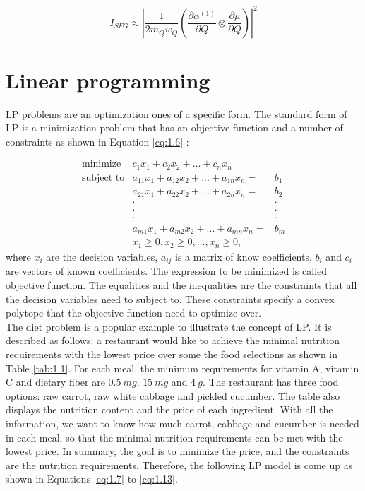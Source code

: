 \begin{equation} \label{eq:1.5}
I_{SFG} \approx \left| \frac{1}{2m_{Q}w_{Q}} \left( \frac{\partial\alpha^{(1)}}{\partial Q} \otimes \frac{\partial\mu}{\partial Q} \right) \right|^{2}
\end{equation}

\section{Linear programming}
LP problems are an optimization ones of a specific form. The standard form of LP is a minimization problem that has an objective function and a number of constraints as shown in Equation \ref{eq:1.6} \cite{UULP}:

\begin{eqnarray}  \label{eq:1.6}
 \text{minimize} & c_{1}x_{1} + c_{2}x_{2} + ... + c_{n} x_{n}  \nonumber \\
 \text{subject to} & a_{11} x_{1} + a_{12} x_{2}+ ... + a_{1n} x_{n} = & b_{1} \nonumber \\
& a_{21} x_{1} + a_{22} x_{2} + ... + a_{2n} x_{n} = & b_{2} \nonumber \\
&\cdot                                    &\cdot \nonumber \\
&\cdot                                    &\cdot \nonumber \\
&\cdot                                    &\cdot \nonumber \\
& a_{m1} x_{1} + a_{m2} x_{2} + ... + a_{mn} x_{n} = & b_{m} \nonumber \\
& x_{1} \geq 0, x_{2} \geq 0, ... ,x_{n} \geq 0, 
\end{eqnarray} 
where $x_{i}$ are the decision variables, $a_{ij}$ is a matrix of know coefficients, $b_{i}$ and $c_{i}$ are vectors of known coefficients. The expression to be minimized is called objective function. The equalities and the inequalities are the constraints that all the decision variables need to subject to. These constraints specify a convex polytope that the objective function need to optimize over. \\ 

The diet problem is a popular example to illustrate the concept of LP. It is described as follows: a restaurant would like to achieve the minimal nutrition requirements with the lowest price over some the food selections as shown in Table \ref{tab:1.1}. For each meal, the minimum requirements for vitamin A, vitamin C and dietary fiber are $0.5~mg$, $15~mg$ and $4~g$. The restaurant has three food options: raw carrot, raw white cabbage and pickled cucumber. The table also displays the nutrition content and the price of each ingredient. With all the information, we want to know how much carrot, cabbage and cucumber is needed in each meal, so that the minimal nutrition requirements can be met with the lowest price. In summary, the goal is to minimize the price, and the constraints are the nutrition requirements. Therefore, the following LP model is come up as shown in Equations \ref{eq:1.7} to \ref{eq:1.13}.

